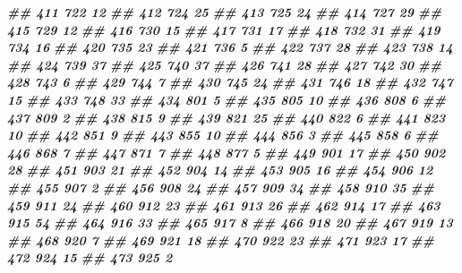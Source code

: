 \documentclass[
]{book}
\newenvironment{Shaded}{\begin{snugshade}}{\end{snugshade}}
\newcommand{\DocumentationTok}[1]{\textcolor[rgb]{0.56,0.35,0.01}{\textbf{\textit{#1}}}}
\theoremstyle{definition}
\theoremstyle{definition}
\theoremstyle{definition}
\theoremstyle{definition}
\theoremstyle{remark}
\begin{document}
\begin{Shaded}
\begin{Highlighting}[]
\DocumentationTok{\#\# 411    722 12}
\DocumentationTok{\#\# 412    724 25}
\DocumentationTok{\#\# 413    725 24}
\DocumentationTok{\#\# 414    727 29}
\DocumentationTok{\#\# 415    729 12}
\DocumentationTok{\#\# 416    730 15}
\DocumentationTok{\#\# 417    731 17}
\DocumentationTok{\#\# 418    732 31}
\DocumentationTok{\#\# 419    734 16}
\DocumentationTok{\#\# 420    735 23}
\DocumentationTok{\#\# 421    736  5}
\DocumentationTok{\#\# 422    737 28}
\DocumentationTok{\#\# 423    738 14}
\DocumentationTok{\#\# 424    739 37}
\DocumentationTok{\#\# 425    740 37}
\DocumentationTok{\#\# 426    741 28}
\DocumentationTok{\#\# 427    742 30}
\DocumentationTok{\#\# 428    743  6}
\DocumentationTok{\#\# 429    744  7}
\DocumentationTok{\#\# 430    745 24}
\DocumentationTok{\#\# 431    746 18}
\DocumentationTok{\#\# 432    747 15}
\DocumentationTok{\#\# 433    748 33}
\DocumentationTok{\#\# 434    801  5}
\DocumentationTok{\#\# 435    805 10}
\DocumentationTok{\#\# 436    808  6}
\DocumentationTok{\#\# 437    809  2}
\DocumentationTok{\#\# 438    815  9}
\DocumentationTok{\#\# 439    821 25}
\DocumentationTok{\#\# 440    822  6}
\DocumentationTok{\#\# 441    823 10}
\DocumentationTok{\#\# 442    851  9}
\DocumentationTok{\#\# 443    855 10}
\DocumentationTok{\#\# 444    856  3}
\DocumentationTok{\#\# 445    858  6}
\DocumentationTok{\#\# 446    868  7}
\DocumentationTok{\#\# 447    871  7}
\DocumentationTok{\#\# 448    877  5}
\DocumentationTok{\#\# 449    901 17}
\DocumentationTok{\#\# 450    902 28}
\DocumentationTok{\#\# 451    903 21}
\DocumentationTok{\#\# 452    904 14}
\DocumentationTok{\#\# 453    905 16}
\DocumentationTok{\#\# 454    906 12}
\DocumentationTok{\#\# 455    907  2}
\DocumentationTok{\#\# 456    908 24}
\DocumentationTok{\#\# 457    909 34}
\DocumentationTok{\#\# 458    910 35}
\DocumentationTok{\#\# 459    911 24}
\DocumentationTok{\#\# 460    912 23}
\DocumentationTok{\#\# 461    913 26}
\DocumentationTok{\#\# 462    914 17}
\DocumentationTok{\#\# 463    915 54}
\DocumentationTok{\#\# 464    916 33}
\DocumentationTok{\#\# 465    917  8}
\DocumentationTok{\#\# 466    918 20}
\DocumentationTok{\#\# 467    919 13}
\DocumentationTok{\#\# 468    920  7}
\DocumentationTok{\#\# 469    921 18}
\DocumentationTok{\#\# 470    922 23}
\DocumentationTok{\#\# 471    923 17}
\DocumentationTok{\#\# 472    924 15}
\DocumentationTok{\#\# 473    925  2}


\end{Highlighting}
\end{Shaded}
\end{document}
